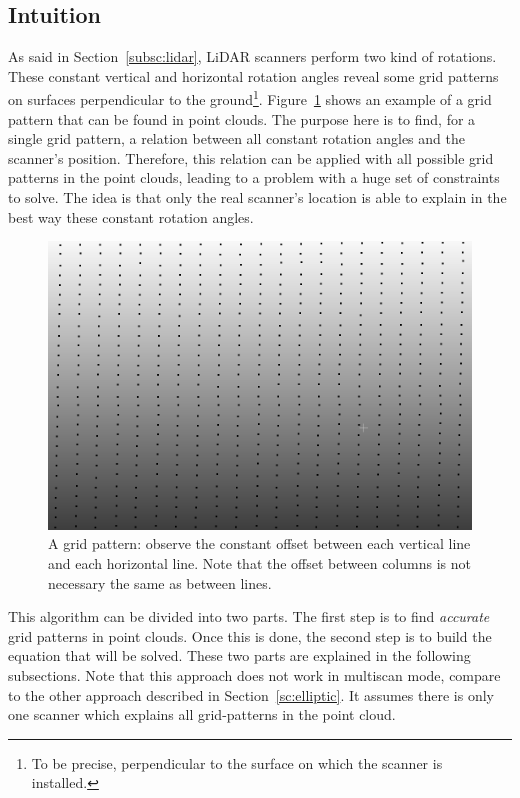 \subsection{Intuition}
As said in Section~\ref{subsc:lidar}, LiDAR scanners perform two kind of rotations. These constant vertical and horizontal rotation angles reveal some grid patterns on surfaces perpendicular to the ground\footnote{To be precise, perpendicular to the surface on which the scanner is installed.}. Figure~\ref{fig:grid1} shows an example of a grid pattern that can be found in point clouds. The purpose here is to find, for a single grid pattern, a relation between all constant rotation angles and the scanner's position. Therefore, this relation can be applied with all possible grid patterns in the point clouds, leading to a problem with a huge set of
constraints to solve. The idea is that only the real scanner's location is able to explain in the best way these constant rotation angles.

\begin{figure}
  \centering
  \includegraphics[scale=0.5]{img/grid1.png}
  \caption{A grid pattern: observe the constant offset between each vertical line and each horizontal line. Note that the offset between columns is not necessary the same as between lines.}
  \label{fig:grid1}
\end{figure}

This algorithm can be divided into two parts. The first step is to find \emph{accurate} grid patterns in point clouds. Once this is done, the second step is to build the equation that will be solved. These two parts are explained in the following subsections. Note that this approach does not work in multiscan mode, compare to the other approach described in Section~\ref{sc:elliptic}. It assumes there is only one scanner which explains all grid-patterns in the point cloud.


